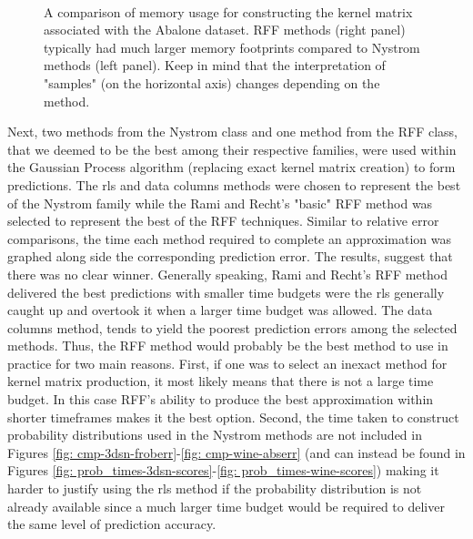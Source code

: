 \begin{figure}[ht]
    \centering
    \\
    \caption{A comparison of memory usage for constructing the kernel matrix associated with the Abalone dataset. RFF methods (right panel) typically had much larger memory footprints compared to Nystrom methods (left panel). Keep in mind that the interpretation of "samples" (on the horizontal axis) changes depending on the method.}
    \label{fig: nys-vs-rff-mem}
\end{figure}

Next, two methods from the Nystrom class and one method from the RFF class, that we deemed to be the best among their respective families, were used within the Gaussian Process algorithm (replacing exact kernel matrix creation) to form predictions. The rls and data columns methods were chosen to represent the best of the Nystrom family while the Rami and Recht's "basic" RFF method was selected to represent the best of the RFF techniques. Similar to relative error comparisons, the time each method required to complete an approximation was graphed along side the corresponding prediction error. The results, suggest that there was no clear winner. Generally speaking, Rami and Recht's RFF method delivered the best predictions with smaller time budgets were the rls generally caught up and overtook it when a larger time budget was allowed. The data columns method, tends to yield the poorest prediction errors among the selected methods. Thus, the RFF method would probably be the best method to use in practice for two main reasons. First, if one was to select an inexact method for kernel matrix production, it most likely means that there is not a large time budget. In this case RFF's ability to produce the best approximation within shorter timeframes makes it the best option. Second, the time taken to construct probability distributions used in the Nystrom methods are not included in Figures \ref{fig: cmp-3dsn-froberr}-\ref{fig: cmp-wine-abserr} (and can instead be found in Figures \ref{fig: prob_times-3dsn-scores}-\ref{fig: prob_times-wine-scores}) making it harder to justify using the rls method if the probability distribution is not already available since a much larger time budget would be required to deliver the same level of prediction accuracy.

